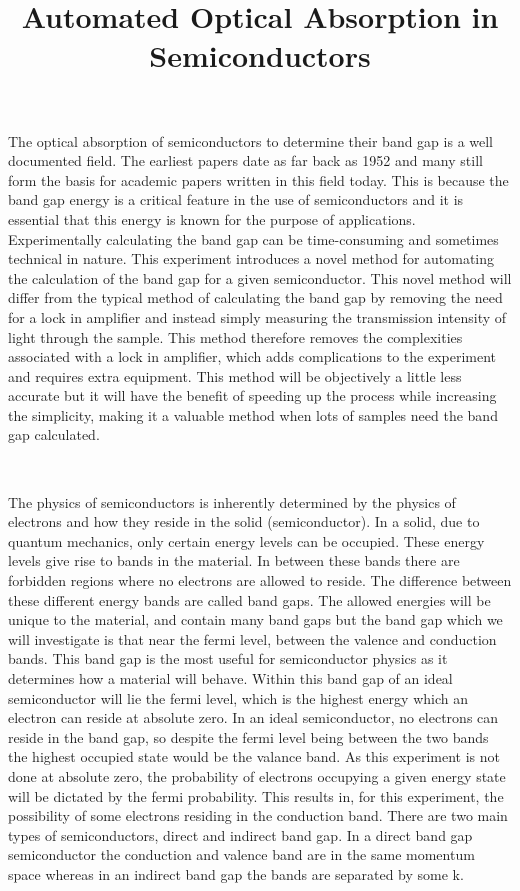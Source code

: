 \documentclass{article}
\date{}
\title{Automated Optical Absorption in Semiconductors}
\begin{document}
\maketitle


The optical absorption of semiconductors to determine their band gap is a well documented field. The earliest papers date as far back as 1952 and many still form the basis for academic papers written in this field today. This is because the band gap energy is a critical feature in the use of semiconductors and it is essential that this energy is known for the purpose of applications. Experimentally calculating the band gap can be time-consuming and sometimes technical in nature. This experiment introduces a novel method for automating the calculation of the band gap for a given semiconductor. This novel method will differ from the typical method of calculating the band gap by removing the need for a lock in amplifier and instead simply measuring the transmission intensity of light through the sample. This method therefore removes the complexities associated with a lock in amplifier, which adds complications to the experiment and requires extra equipment. This method will be objectively a little less accurate but it will have the benefit of speeding up the process while increasing the simplicity, making it a valuable method when lots of samples need the band gap calculated. 

\

The physics of semiconductors is inherently determined by the physics of electrons and how they reside in the solid (semiconductor). In a solid, due to quantum mechanics, only certain energy levels can be occupied. These energy levels give rise to bands in the material. In between these bands there are forbidden regions where no electrons are allowed to reside. The difference between these different energy bands are called band gaps. \cite{luis} The allowed energies will be unique to the material, and contain many band gaps but the band gap which we will investigate is that near the fermi level, between the valence and conduction bands. This band gap is the most useful for semiconductor physics as it determines how a material will behave. Within this band gap of an ideal semiconductor will lie the fermi level, which is the highest energy which an electron can reside at absolute zero. In an ideal semiconductor, no electrons can reside in the band gap, so despite the fermi level being between the two bands the highest occupied state would be the valance band. As this experiment is not done at absolute zero, the probability of electrons occupying a given energy state will be dictated by the fermi probability. This results in, for this experiment, the possibility of some electrons residing in the conduction band. \cite{simpson} There are two main types of semiconductors, direct and indirect band gap. In a direct band gap semiconductor the conduction and valence band are in the same momentum space whereas in an indirect band gap the bands are separated by some k.
\end{document}
